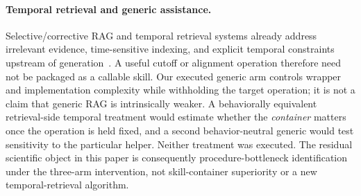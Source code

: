 \paragraph{Temporal retrieval and generic assistance.}
Selective/corrective RAG and temporal retrieval systems already address irrelevant evidence, time-sensitive indexing, and explicit temporal constraints upstream of generation~\citep{asai2024selfrag,yan2024crag,zhang2025mrag,abdallah2026tempretriever,han2025temporalgraphs,wang2026iarag,liu2026chronos}. A useful cutoff or alignment operation therefore need not be packaged as a callable skill. Our executed generic arm controls wrapper and implementation complexity while withholding the target operation; it is not a claim that generic RAG is intrinsically weaker. A behaviorally equivalent retrieval-side temporal treatment would estimate whether the \emph{container} matters once the operation is held fixed, and a second behavior-neutral generic would test sensitivity to the particular helper. Neither treatment was executed. The residual scientific object in this paper is consequently procedure-bottleneck identification under the three-arm intervention, not skill-container superiority or a new temporal-retrieval algorithm.
